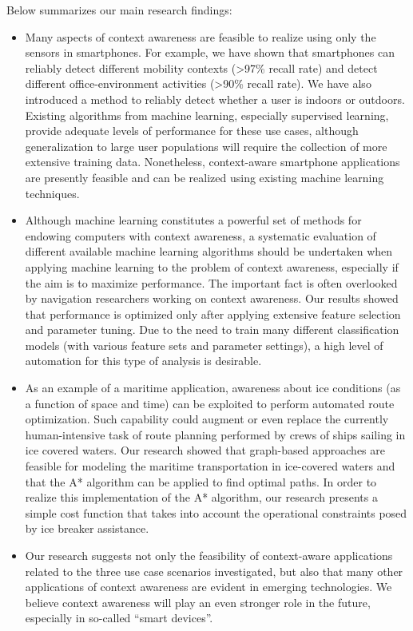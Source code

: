Below summarizes our main research findings:
%
\begin{itemize}
\item Many aspects of context awareness are feasible to realize using only the sensors in smartphones. For example, we have shown that smartphones can reliably detect different mobility contexts (\textgreater97\% recall rate) and detect different office-environment activities (\textgreater90\% recall rate). We have also introduced a method to reliably detect whether a user is indoors or outdoors. Existing algorithms from machine learning, especially supervised learning, provide adequate levels of performance for these use cases, although generalization to large user populations will require the collection of more extensive training data. Nonetheless, context-aware smartphone applications are presently feasible and can be realized using existing machine learning techniques.
%
\item Although machine learning constitutes a powerful set of methods for endowing computers with context awareness, a systematic evaluation of different available machine learning algorithms should be undertaken when applying machine learning to the problem of context awareness, especially if the aim is to maximize performance. The important fact is often overlooked by navigation researchers working on context awareness. Our results showed that performance is optimized only after applying extensive feature selection and parameter tuning. Due to the need to train many different classification models (with various feature sets and parameter settings), a high level of automation for this type of analysis is desirable.
%
\item As an example of a maritime application, awareness about ice conditions (as a function of space and time) can be exploited to perform automated route optimization. Such capability could augment or even replace the currently human-intensive task of route planning performed by crews of ships sailing in ice covered waters. Our research showed that graph-based approaches are feasible for modeling the maritime transportation in ice-covered waters and that the A* algorithm can be applied to find optimal paths. In order to realize this implementation of the A* algorithm, our research presents a simple cost function that takes  into account the operational constraints posed by ice breaker assistance.
%
\item Our research suggests not only the feasibility of context-aware applications related to the three use case scenarios investigated, but also that many other applications of context awareness are evident in emerging technologies. We believe context awareness will play an even stronger role in the future, especially in so-called ``smart devices''.
%
\end{itemize}

